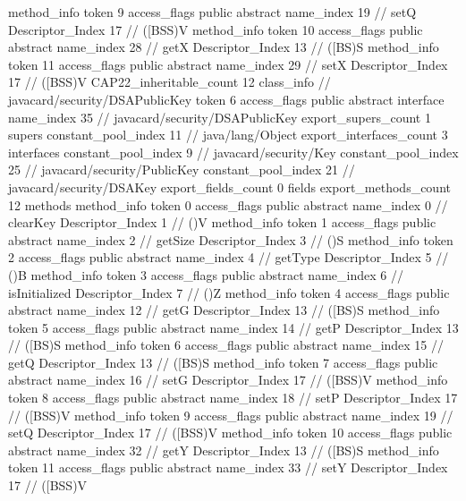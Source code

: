 {{{{{				}
				method_info {
					token	9
					access_flags	public abstract
					name_index	19		// setQ
					Descriptor_Index	17		// ([BSS)V
				}
				method_info {
					token	10
					access_flags	public abstract
					name_index	28		// getX
					Descriptor_Index	13		// ([BS)S
				}
				method_info {
					token	11
					access_flags	public abstract
					name_index	29		// setX
					Descriptor_Index	17		// ([BSS)V
				}
			}
			CAP22_inheritable_count	12
		}
		class_info {		// javacard/security/DSAPublicKey
			token	6
			access_flags	public abstract interface
			name_index	35		// javacard/security/DSAPublicKey
			export_supers_count	1
			supers {
				constant_pool_index	11		// java/lang/Object
			}
			export_interfaces_count	3
			interfaces {
				constant_pool_index	9		// javacard/security/Key
				constant_pool_index	25		// javacard/security/PublicKey
				constant_pool_index	21		// javacard/security/DSAKey
			}
			export_fields_count	0
			fields {
			}
			export_methods_count	12
			methods {
				method_info {
					token	0
					access_flags	public abstract
					name_index	0		// clearKey
					Descriptor_Index	1		// ()V
				}
				method_info {
					token	1
					access_flags	public abstract
					name_index	2		// getSize
					Descriptor_Index	3		// ()S
				}
				method_info {
					token	2
					access_flags	public abstract
					name_index	4		// getType
					Descriptor_Index	5		// ()B
				}
				method_info {
					token	3
					access_flags	public abstract
					name_index	6		// isInitialized
					Descriptor_Index	7		// ()Z
				}
				method_info {
					token	4
					access_flags	public abstract
					name_index	12		// getG
					Descriptor_Index	13		// ([BS)S
				}
				method_info {
					token	5
					access_flags	public abstract
					name_index	14		// getP
					Descriptor_Index	13		// ([BS)S
				}
				method_info {
					token	6
					access_flags	public abstract
					name_index	15		// getQ
					Descriptor_Index	13		// ([BS)S
				}
				method_info {
					token	7
					access_flags	public abstract
					name_index	16		// setG
					Descriptor_Index	17		// ([BSS)V
				}
				method_info {
					token	8
					access_flags	public abstract
					name_index	18		// setP
					Descriptor_Index	17		// ([BSS)V
				}
				method_info {
					token	9
					access_flags	public abstract
					name_index	19		// setQ
					Descriptor_Index	17		// ([BSS)V
				}
				method_info {
					token	10
					access_flags	public abstract
					name_index	32		// getY
					Descriptor_Index	13		// ([BS)S
				}
				method_info {
					token	11
					access_flags	public abstract
					name_index	33		// setY
					Descriptor_Index	17		// ([BSS)V
}}}}}
